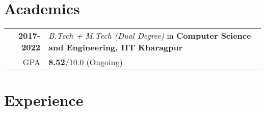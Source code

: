 \documentclass[a4paper,10pt]{extarticle} %
\begin{document}
\vspace{-0.4cm}
\section{\textcolor{primary}{Academics}}

\begin{tabular}{r|p{17.5cm}}	
\textbf{2017-2022} & \textit{B.Tech + M.Tech (Dual Degree)} in \textbf{Computer Science and Engineering, IIT Kharagpur}\\
\hfill GPA & \textbf{8.52}/10.0 (Ongoing)\\
\end{tabular}

\vspace{-0.3cm}
\section{\textcolor{primary}{Experience}}
\end{document}
